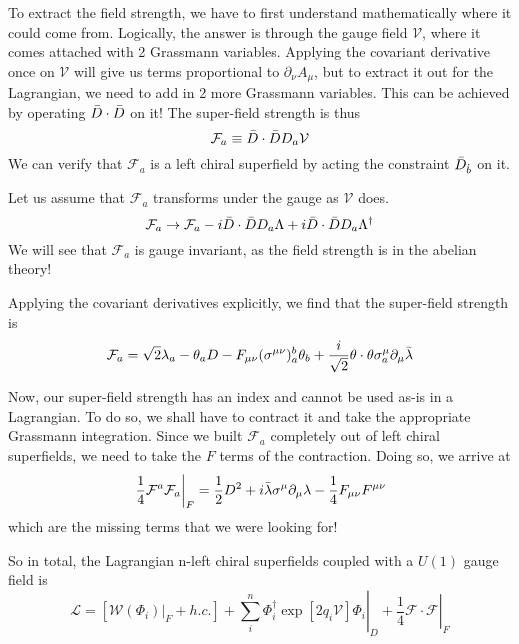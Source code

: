 To extract the field strength, we have to first understand mathematically where it could come from. Logically, the answer is through the gauge field $\mathcal{V}$, where it comes attached with 2 Grassmann variables. Applying the covariant derivative once on $\mathcal{V}$ will give us terms proportional to $\partial_\nu A_\mu$, but to extract it out for the Lagrangian, we need to add in 2 more Grassmann variables. This can be achieved by operating $\Bar{D} \cdot \Bar{D}$ on it! The super-field strength is thus
\begin{equation}
    \mathcal{F}_a \equiv \Bar{D} \cdot \Bar{D} D_a \mathcal{V}
\end{equation}
We can verify that $\mathcal{F}_a$ is a left chiral superfield by acting the constraint $\Bar{D}_{\Dot{b}}$ on it.

Let us assume that $\mathcal{F}_a$ transforms under the gauge as $\mathcal{V}$ does.
\begin{equation}
    \mathcal{F}_a \rightarrow \mathcal{F}_a - i \Bar{D} \cdot \Bar{D} D_a \Lambda + i \Bar{D} \cdot \Bar{D} D_a \Lambda^\dagger
\end{equation}
We will see that $\mathcal{F}_a$ is gauge invariant, as the field strength is in the abelian theory!

Applying the covariant derivatives explicitly, we find that the super-field strength is
\begin{equation}
    \mathcal{F}_a = \sqrt{2}\lambda_a - \theta_a D - F_{\mu\nu} (\sigma^{\mu\nu})^b_a \theta_b + \frac{i}{\sqrt{2}} \theta \cdot \theta \sigma^\mu_a \partial_\mu \Bar{\lambda}
\end{equation}

Now, our super-field strength has an index and cannot be used as-is in a Lagrangian. To do so, we shall have to contract it and take the appropriate Grassmann integration. Since we built $\mathcal{F}_a$ completely out of left chiral superfields, we need to take the $F$ terms of the contraction. Doing so, we arrive at
\begin{equation}
    \left.\frac{1}{4} \mathcal{F}^a\mathcal{F}_a\right\vert_F = \frac{1}{2} D^2 + i\Bar{\lambda}\sigma^\mu \partial_\mu \lambda - \frac{1}{4} F_{\mu\nu}F^{\mu\nu}
\end{equation}
which are the missing terms that we were looking for!

So in total, the Lagrangian n-left chiral superfields coupled with a $U(1)$ gauge field is
\begin{equation}
    \mathcal{L} = \left[\left.\mathcal{W}(\Phi_i)\right\vert_F + h.c.\right] + \left.\sum_i^n \Phi_i^\dagger \exp[2q_i\mathcal{V}]\Phi_i\right\vert_D + \left.\frac{1}{4} \mathcal{F} \cdot \mathcal{F} \right\vert_F
\end{equation}

